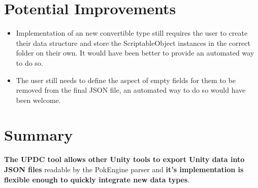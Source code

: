 \documentclass[12pt,a4paper]{article}
\begin{document}
\section{Potential Improvements}
\begin{itemize}
\item Implementation of an new convertible type still requires the user to create their data structure and store the ScriptableObject instances in the correct folder on their own. It would have been better to provide an automated way to do so.
\item The user still needs to define the aspect of empty fields for them to be removed from the final JSON file, an automated way to do so would have been welcome.
\end{itemize}

\section{Summary}
\textbf{The UPDC tool allows other Unity tools to export Unity data into JSON files} readable by the PokEngine parser and \textbf{it's implementation is flexible enough to quickly integrate new data types}.\\\\
\end{document}
